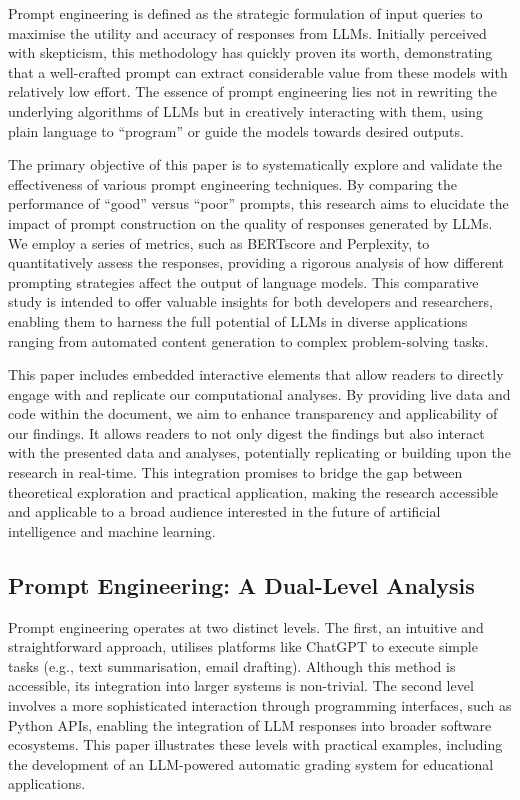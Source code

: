 \documentclass[
]{agujournal2019}
\begin{document}
Prompt engineering is defined as the strategic formulation of input
queries to maximise the utility and accuracy of responses from LLMs.
Initially perceived with skepticism, this methodology has quickly proven
its worth, demonstrating that a well-crafted prompt can extract
considerable value from these models with relatively low effort. The
essence of prompt engineering lies not in rewriting the underlying
algorithms of LLMs but in creatively interacting with them, using plain
language to ``program'' or guide the models towards desired outputs.

The primary objective of this paper is to systematically explore and
validate the effectiveness of various prompt engineering techniques. By
comparing the performance of ``good'' versus ``poor'' prompts, this
research aims to elucidate the impact of prompt construction on the
quality of responses generated by LLMs. We employ a series of metrics,
such as BERTscore and Perplexity, to quantitatively assess the
responses, providing a rigorous analysis of how different prompting
strategies affect the output of language models. This comparative study
is intended to offer valuable insights for both developers and
researchers, enabling them to harness the full potential of LLMs in
diverse applications ranging from automated content generation to
complex problem-solving tasks.

This paper includes embedded interactive elements that allow readers to
directly engage with and replicate our computational analyses. By
providing live data and code within the document, we aim to enhance
transparency and applicability of our findings. It allows readers to not
only digest the findings but also interact with the presented data and
analyses, potentially replicating or building upon the research in
real-time. This integration promises to bridge the gap between
theoretical exploration and practical application, making the research
accessible and applicable to a broad audience interested in the future
of artificial intelligence and machine learning.

\subsection{Prompt Engineering: A Dual-Level
Analysis}\label{prompt-engineering-a-dual-level-analysis}

Prompt engineering operates at two distinct levels. The first, an
intuitive and straightforward approach, utilises platforms like ChatGPT
to execute simple tasks (e.g., text summarisation, email drafting).
Although this method is accessible, its integration into larger systems
is non-trivial. The second level involves a more sophisticated
interaction through programming interfaces, such as Python APIs,
enabling the integration of LLM responses into broader software
ecosystems. This paper illustrates these levels with practical examples,
including the development of an LLM-powered automatic grading system for
educational applications.
\end{document}
